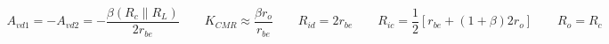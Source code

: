 \begin{equation*}
  \begin{aligned}
    A_{vd1} = - A_{vd2} = - \dfrac{\beta \left( R_c \parallel R_L \right)}{2 r_{be}} \quad\quad K_{CMR} \approx \dfrac{\beta r_o}{r_{be}} \quad\quad R_{id} = 2 r_{be} \quad\quad R_{ic} = \dfrac{1}{2} \left[ r_{be} + \left( 1 + \beta \right) 2 r_o \right] \quad\quad R_o = R_c
  \end{aligned}
\end{equation*}

